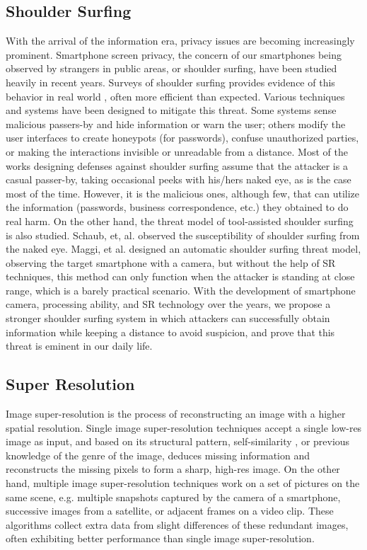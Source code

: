 \subsection{Shoulder Surfing}
With the arrival of the information era, privacy issues are becoming increasingly prominent. Smartphone screen privacy, the concern of our smartphones being observed by strangers in public areas, or shoulder surfing, have been studied heavily in recent years. Surveys of shoulder surfing provides evidence of this behavior in real world \cite{eiband2017understanding} \cite{goucher2011look}, often more efficient than expected\cite{kwon2013covert}. Various techniques and systems have been designed to mitigate this threat. Some systems sense malicious passers-by and hide information \cite{brudy2014anyone} or warn the user\cite{saad2018communicating}; others modify the user interfaces to create honeypots (for passwords)\cite{chakraborty2014tag}, confuse unauthorized parties\cite{wiedenbeck2006design}, or making the interactions invisible\cite{kumar2007reducing} or unreadable from a distance\cite{Chun2019Keep}. Most of the works designing defenses against shoulder surfing assume that the attacker is a casual passer-by, taking occasional peeks with his/hers naked eye, as is the case most of the time\cite{eiband2017understanding}. However, it is the malicious ones, although few, that can utilize the information (passwords, business correspondence, etc.) they obtained to do real harm. On the other hand, the threat model of tool-assisted shoulder surfing is also studied. Schaub, et, al. observed the susceptibility of shoulder surfing from the naked eye\cite{schaub2012password}. Maggi, et al. designed an automatic shoulder surfing threat model, observing the target smartphone with a camera\cite{maggi2011poster}, but without the help of SR techniques, this method can only function when the attacker is standing at close range, which is a barely practical scenario. With the development of smartphone camera, processing ability, and SR technology over the years, we propose a stronger shoulder surfing system in which attackers can successfully obtain information while keeping a distance to avoid suspicion, and prove that this threat is eminent in our daily life.

\subsection{Super Resolution}
Image super-resolution is the process of reconstructing an image with a higher spatial resolution. Single image super-resolution techniques accept a single low-res image as input, and based on its structural pattern, self-similarity \cite{suetake2008image}, or previous knowledge of the genre of the image, deduces missing information and reconstructs the missing pixels to form a sharp, high-res image. On the other hand, multiple image super-resolution techniques work on a set of pictures on the same scene, e.g. multiple snapshots captured by the camera of a smartphone, successive images from a satellite, or adjacent frames on a video clip. These algorithms collect extra data from slight differences of these redundant images, often exhibiting better performance than single image super-resolution.


